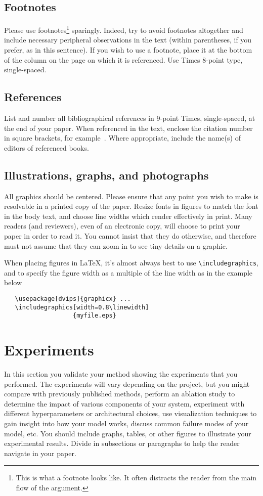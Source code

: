 \documentclass[10pt,twocolumn,letterpaper]{article}
\begin{document}
\subsection{Footnotes}
Please use footnotes\footnote {This is what a footnote looks like.  It
often distracts the reader from the main flow of the argument.} sparingly.
Indeed, try to avoid footnotes altogether and include necessary peripheral
observations in
the text (within parentheses, if you prefer, as in this sentence).  If you
wish to use a footnote, place it at the bottom of the column on the page on
which it is referenced. Use Times 8-point type, single-spaced.
\subsection{References}
List and number all bibliographical references in 9-point Times,
single-spaced, at the end of your paper. When referenced in the text,
enclose the citation number in square brackets, for
example~\cite{Authors14}.  Where appropriate, include the name(s) of
editors of referenced books.
\subsection{Illustrations, graphs, and photographs}
All graphics should be centered.  Please ensure that any point you wish to
make is resolvable in a printed copy of the paper.  Resize fonts in figures
to match the font in the body text, and choose line widths which render
effectively in print.  Many readers (and reviewers), even of an electronic
copy, will choose to print your paper in order to read it.  You cannot
insist that they do otherwise, and therefore must not assume that they can
zoom in to see tiny details on a graphic.

When placing figures in \LaTeX, it's almost always best to use
\verb+\includegraphics+, and to specify the  figure width as a multiple of
the line width as in the example below
{\small\begin{verbatim}
   \usepackage[dvips]{graphicx} ...
   \includegraphics[width=0.8\linewidth]
                   {myfile.eps}
\end{verbatim}
}

\section{Experiments}
In this section you validate your method showing the experiments that you performed. The experiments will vary depending on the project, but you might compare with previously published methods, perform an ablation study to determine the impact of various components of your system, experiment with different hyperparameters or architectural choices, use visualization techniques to gain insight into how your model works, discuss common failure modes of your model, etc. You should include graphs, tables, or other figures to illustrate your experimental results. Divide in subsections or paragraphs to help the reader navigate in your paper.
\end{document}
